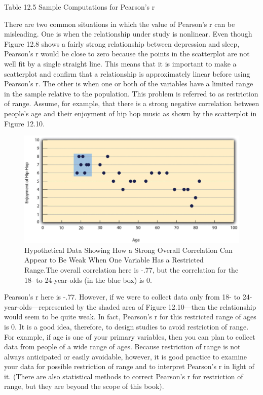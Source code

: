 Table 12.5 Sample Computations for Pearson's r
  
There are two common situations in which the value of Pearson's r can be misleading. One is when the relationship under study is nonlinear. Even though Figure 12.8 shows a fairly strong relationship between depression and sleep, Pearson's r would be close to zero because the points in the scatterplot are not well fit by a single straight line. This means that it is important to make a scatterplot and confirm that a relationship is approximately linear before using Pearson's r. The other is when one or both of the variables have a limited range in the sample relative to the population. This problem is referred to as restriction of range. Assume, for example, that there is a strong negative correlation between people's age and their enjoyment of hip hop music as shown by the scatterplot in Figure 12.10. 

\begin{figure}
\includegraphics[width=\linewidth]{figures/Fig12-10}
\caption{Hypothetical Data Showing How a Strong Overall Correlation Can Appear to Be Weak When One Variable Has a Restricted Range.The overall correlation here is -.77, but the correlation for the 18- to 24-year-olds (in the blue box) is 0.}
\label{fig:restricted}
\end{figure}

Pearson's r here is -.77. However, if we were to collect data only from 18- to 24-year-olds---represented by the shaded area of Figure 12.10---then the relationship would seem to be quite weak. In fact, Pearson's r for this restricted range of ages is 0. It is a good idea, therefore, to design studies to avoid restriction of range. For example, if age is one of your primary variables, then you can plan to collect data from people of a wide range of ages. Because restriction of range is not always anticipated or easily avoidable, however, it is good practice to examine your data for possible restriction of range and to interpret Pearson's r in light of it. (There are also statistical methods to correct Pearson's r for restriction of range, but they are beyond the scope of this book).


